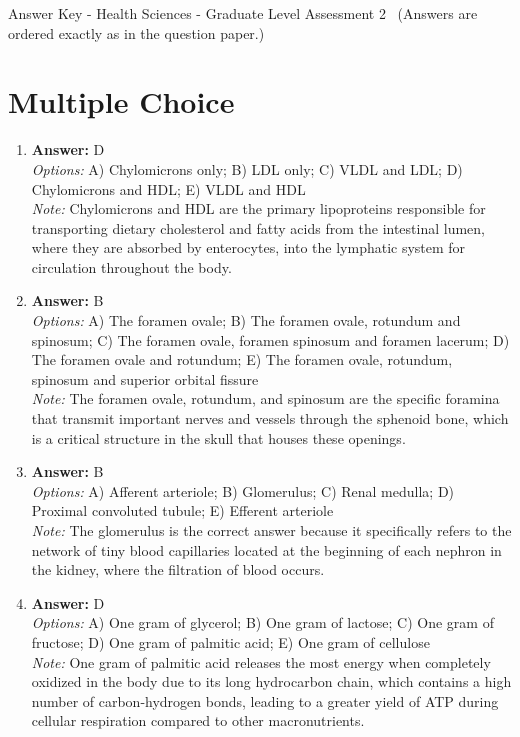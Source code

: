 \documentclass[12pt]{article}
\begin{document}
\begin{center}
Answer Key - Health Sciences - Graduate Level Assessment 2 \
\small (Answers are ordered exactly as in the question paper.)
\end{center}

\section*{Multiple Choice}
\begin{enumerate}[label=\arabic*.]
\item \textbf{Answer:} D
\\ \textit{Options:} A) Chylomicrons only; B) LDL only; C) VLDL and LDL; D) Chylomicrons and HDL; E) VLDL and HDL
\\ \textit{Note:} Chylomicrons and HDL are the primary lipoproteins responsible for transporting dietary cholesterol and fatty acids from the intestinal lumen, where they are absorbed by enterocytes, into the lymphatic system for circulation throughout the body.
\item \textbf{Answer:} B
\\ \textit{Options:} A) The foramen ovale; B) The foramen ovale, rotundum and spinosum; C) The foramen ovale, foramen spinosum and foramen lacerum; D) The foramen ovale and rotundum; E) The foramen ovale, rotundum, spinosum and superior orbital fissure
\\ \textit{Note:} The foramen ovale, rotundum, and spinosum are the specific foramina that transmit important nerves and vessels through the sphenoid bone, which is a critical structure in the skull that houses these openings.
\item \textbf{Answer:} B
\\ \textit{Options:} A) Afferent arteriole; B) Glomerulus; C) Renal medulla; D) Proximal convoluted tubule; E) Efferent arteriole
\\ \textit{Note:} The glomerulus is the correct answer because it specifically refers to the network of tiny blood capillaries located at the beginning of each nephron in the kidney, where the filtration of blood occurs.
\item \textbf{Answer:} D
\\ \textit{Options:} A) One gram of glycerol; B) One gram of lactose; C) One gram of fructose; D) One gram of palmitic acid; E) One gram of cellulose
\\ \textit{Note:} One gram of palmitic acid releases the most energy when completely oxidized in the body due to its long hydrocarbon chain, which contains a high number of carbon-hydrogen bonds, leading to a greater yield of ATP during cellular respiration compared to other macronutrients.

\end{enumerate}
\end{document}
